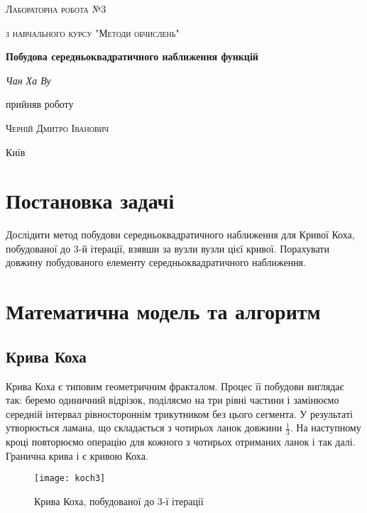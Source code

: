 \documentclass[12pt,a4paper]{article}
\begin{document}
\begin{titlepage}
	\centering
	{\scshape\LARGE Лабораторна робота №3 \par}
	\vspace{1cm}
	{\scshape\Large з навчального курсу "Методи обчислень"\par}
	\vspace{1.5cm}
	{\huge\bfseries Побудова середньоквадратичного наближення функцій\par}
	\vspace{2cm}
	{\Large\itshape Чан Ха Ву\par}	
	\vfill
	прийняв роботу\par
	\textsc{Черній Дмитро Іванович}
	\vfill

	{\large Київ \the\year}
\end{titlepage}

\setlength{\parindent}{3em}
\setlength{\parskip}{1em}

\section{Постановка задачі}
Дослідити метод побудови середньоквадратичного наближення для Кривої Коха, побудованої до 3-й ітерації, взявши за вузли вузли цієї кривої. Порахувати довжину побудованого елементу середньоквадратичного наближення.

\section{Математична модель та алгоритм}
	\subsection{Крива Коха}
	Крива Коха є типовим геометричним фракталом. Процес її побудови виглядає так: беремо одиничний відрізок, поділяємо на три рівні частини і замінюємо середній інтервал рівностороннім трикутником без цього сегмента. У результаті утворюється ламана, що складається з чотирьох ланок довжини $\frac{1}{3}$. На наступному кроці повторюємо операцію для кожного з чотирьох отриманих ланок і так далі. Гранична крива і є кривою Коха.
	
	\begin{figure}[!ht]
		\caption{Крива Коха, побудованої до 3-ї ітерації}
		\centering
    	\texttt{[image: koch3]}
	\end{figure}	
\end{document}

